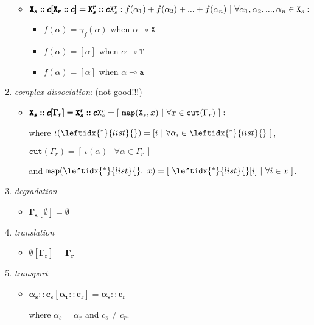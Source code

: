 \documentclass{entcs}
\renewcommand{\~}[0]{\texttildelow}
\begin{document}
\begin{definition}
\begin{enumerate}
\begin{itemize}
\item $\pmb{\mathtt{X}_s::c[\mathtt{X}_r::c] = \mathtt{X}^r_s::c} \newline \mathtt{X}^r_s : f(\alpha_1) + f(\alpha_2) + ... + f(\alpha_n)~|~\forall \alpha_1, \alpha_2, ..., \alpha_n \in \mathtt{X}_s :$
\begin{itemize}
	\item $ f(\alpha) = \gamma_f(\alpha)$ when $\alpha \multimap \mathtt{X} $
	\item $ f(\alpha) = [\alpha]$ when $\alpha \multimap \mathtt{T}$
	\item $ f(\alpha) = [\alpha]$ when $\alpha \multimap \mathtt{a}$
\end{itemize}

\end{itemize}

\item \textit{complex dissociation}: (not good!!!)

\begin{itemize}
\item $ \pmb{\mathtt{X}_s::c[\Gamma_r] = \mathtt{X}^r_s::c} \newline \mathtt{X}^r_s = [~\mathtt{map}(\mathtt{X}_s, x)~|~\forall x \in \mathtt{cut}(\Gamma_r)~]:$

where $\iota(\leftidx{^*}{list}{}) = [i~|~\forall \alpha_i \in \leftidx{^*}{list}{}~]$,

$\mathtt{cut}(\Gamma_r) = [~\iota(\alpha)~|~\forall \alpha \in \Gamma_r~]$

and $\mathtt{map}(\leftidx{^*}{list}{},~x) = [~\leftidx{^*}{list}{}[i]~|~\forall i \in x~] $.

\end{itemize}

\item \textit{degradation}
\begin{itemize}
\item $  \pmb{\Gamma_s[\emptyset] = \emptyset} $
\end{itemize}

\item \textit{translation}
\begin{itemize}
\item $ \pmb{\emptyset[\Gamma_r] = \Gamma_r} $
\end{itemize}

\item \textit{transport}:
\begin{itemize}
\item $ \pmb{\alpha_s::c_s[\alpha_r::c_r] = \alpha_s::c_r} $

where $\alpha_s = \alpha_r$ and $ c_s \neq c_r $.
\end{itemize}

\end{enumerate}
\end{definition}
\end{document}
